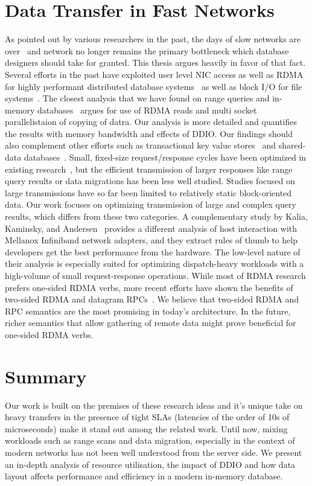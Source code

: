 \section{Data Transfer in Fast Networks}
As pointed out by various researchers in the past, the days of slow networks are over~\cite{slow} 
and network no longer remains the primary bottleneck which database designers should take for granted.
This thesis argues heavily in favor of that fact. Several efforts in the past have exploited
user level NIC access as well as RDMA for highly performant distributed database systems~\cite{ramcloud,farm,farmtx,drtm,hyper}
as well as block I/O for file systems~\cite{rdmagfs}. The closest analysis that we have found on 
range queries and in-memory databases~\cite{zerocopyrangequery} argues for use of RDMA reads and 
multi socket parallelistaion of copying of datra. Our analysis is more detailed and quantifies the 
results with memory bandwidth and effects of DDIO.
Our findings should also complement other efforts such as transactional key value stores~\cite{deuteronomy} 
and shared-data databases~\cite{tell}. Small, fixed-size request/response cycles have been optimized in
existing research~\cite{farm,herd,mica,rdma,ramcloud}, but the efficient
transmission of larger responses like range query results or data
migrations has been less well studied. Studies focused on large transmissions
have so far been limited to relatively static block-oriented data.
Our work focuses on optimizing transmission of large and complex query
results, which differs from these two categories. A complementary study by Kalia, Kaminsky, and Andersen~\cite{rdma} provides a
different analysis of host interaction with Mellanox Infiniband network adapters,
and they extract rules of thumb to help developers get the best performance from the hardware.
The low-level nature of their analysis is especially suited for
optimizing dispatch-heavy workloads with a high-volume of small
request-response operations. While most of RDMA research prefers one-sided RDMA verbs, more recent efforts have shown 
the benefits of two-sided RDMA and datagram RPCs~\cite{fasst}. We believe that 
two-sided RDMA and RPC semantics are the most promising in today's architecture. In the future, 
richer semantics that allow  gathering of remote data might prove beneficial for one-sided RDMA verbs.


\section{Summary}
Our work is built on the premises of these research ideas and it's unique take on
heavy transfers in the presence of tight SLAs (latencies of the order of 10s of microseconds)
make it stand out among the related work. Until now, mixing workloads such as range scans 
and data migration, especially in the context of modern networks has not been well
 understood from the server side. We present an in-depth analysis of resource utilisation, 
 the impact of DDIO and how data layout affects performance and efficiency in a modern 
 in-memory database.